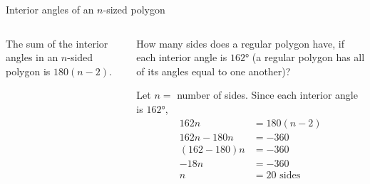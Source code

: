 \documentclass[9pt,aspectratio=169]{beamer}
\begin{document}
\begin{frame}{Interior angles of an $n$-sized polygon}
\begin{columns}[T]
\begin{column}{0.5\textwidth}
      \begin{definition}
        The sum of the interior angles in an $n$-sided polygon is $180(n - 2)$.
      \end{definition}
    \end{column}
    \begin{column}{0.5\textwidth}
      \begin{problem}
        How many sides does a regular polygon have, if each interior angle is $162°$ (a regular polygon has all of its angles equal to one another)?
      \end{problem}
      Let $n =$ number of sides.  Since each interior angle is $162°$, 
      \begin{align*}
        162 n &= 180(n-2) \\
        162n - 180n &= -360 \\                                          
        (162-180)n  &= -360 \\
        -18n &= -360 \\
        n &= 20 \text{ sides}
      \end{align*}
    \end{column}
  \end{columns}
\end{frame}
\end{document}
